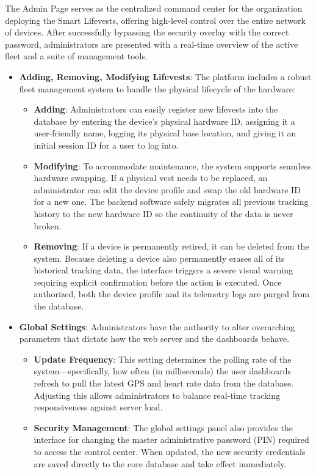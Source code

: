\documentclass{article}
\begin{document}
The Admin Page serves as the centralized command center for the organization deploying the Smart Lifevests, offering high-level control over the entire network of devices. After successfully bypassing the security overlay with the correct password, administrators are presented with a real-time overview of the active fleet and a suite of management tools.
\begin{itemize}
\item \textbf{Adding, Removing, Modifying Lifevests}: The platform includes a robust fleet management system to handle the physical lifecycle of the hardware:
\begin{itemize}
\item \textbf{Adding}: Administrators can easily register new lifevests into the database by entering the device's physical hardware ID, assigning it a user-friendly name, logging its physical base location, and giving it an initial session ID for a user to log into.
\item \textbf{Modifying}: To accommodate maintenance, the system supports seamless hardware swapping. If a physical vest needs to be replaced, an administrator can edit the device profile and swap the old hardware ID for a new one. The backend software safely migrates all previous tracking history to the new hardware ID so the continuity of the data is never broken.
\item \textbf{Removing}: If a device is permanently retired, it can be deleted from the system. Because deleting a device also permanently erases all of its historical tracking data, the interface triggers a severe visual warning requiring explicit confirmation before the action is executed. Once authorized, both the device profile and its telemetry logs are purged from the database.
\end{itemize}
\item \textbf{Global Settings}: Administrators have the authority to alter overarching parameters that dictate how the web server and the dashboards behave.
\begin{itemize}
    \item \textbf{Update Frequency}: This setting determines the polling rate of the system—specifically, how often (in milliseconds) the user dashboards refresh to pull the latest GPS and heart rate data from the database. Adjusting this allows administrators to balance real-time tracking responsiveness against server load.
    \item \textbf{Security Management}: The global settings panel also provides the interface for changing the master administrative password (PIN) required to access the control center. When updated, the new security credentials are saved directly to the core database and take effect immediately.
\end{itemize}
\end{itemize}
\end{document}
